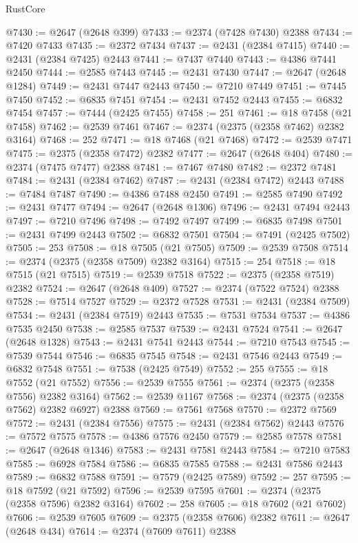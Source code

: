 \begin{lexlean}{RustCore}
\begin{coremodule}
@7430 := @2647 (@2648 @399)
@7433 := @2374 (@7428 @7430) @2388
@7434 := @7420 @7433
@7435 := @2372 @7434
@7437 := @2431 (@2384 @7415)
@7440 := @2431 (@2384 @7425) @2443
@7441 := @7437 @7440
@7443 := @4386 @7441 @2450
@7444 := @2585 @7443
@7445 := @2431 @7430
@7447 := @2647 (@2648 @1284)
@7449 := @2431 @7447 @2443
@7450 := @7210 @7449
@7451 := @7445 @7450
@7452 := @6835 @7451
@7454 := @2431 @7452 @2443
@7455 := @6832 @7454
@7457 := @7444 (@2425 @7455)
@7458 := 251
@7461 := @18 @7458 (@21 @7458)
@7462 := @2539 @7461
@7467 := @2374 (@2375 (@2358 @7462) @2382 @3164)
@7468 := 252
@7471 := @18 @7468 (@21 @7468)
@7472 := @2539 @7471
@7475 := @2375 (@2358 @7472) @2382
@7477 := @2647 (@2648 @404)
@7480 := @2374 (@7475 @7477) @2388
@7481 := @7467 @7480
@7482 := @2372 @7481
@7484 := @2431 (@2384 @7462)
@7487 := @2431 (@2384 @7472) @2443
@7488 := @7484 @7487
@7490 := @4386 @7488 @2450
@7491 := @2585 @7490
@7492 := @2431 @7477
@7494 := @2647 (@2648 @1306)
@7496 := @2431 @7494 @2443
@7497 := @7210 @7496
@7498 := @7492 @7497
@7499 := @6835 @7498
@7501 := @2431 @7499 @2443
@7502 := @6832 @7501
@7504 := @7491 (@2425 @7502)
@7505 := 253
@7508 := @18 @7505 (@21 @7505)
@7509 := @2539 @7508
@7514 := @2374 (@2375 (@2358 @7509) @2382 @3164)
@7515 := 254
@7518 := @18 @7515 (@21 @7515)
@7519 := @2539 @7518
@7522 := @2375 (@2358 @7519) @2382
@7524 := @2647 (@2648 @409)
@7527 := @2374 (@7522 @7524) @2388
@7528 := @7514 @7527
@7529 := @2372 @7528
@7531 := @2431 (@2384 @7509)
@7534 := @2431 (@2384 @7519) @2443
@7535 := @7531 @7534
@7537 := @4386 @7535 @2450
@7538 := @2585 @7537
@7539 := @2431 @7524
@7541 := @2647 (@2648 @1328)
@7543 := @2431 @7541 @2443
@7544 := @7210 @7543
@7545 := @7539 @7544
@7546 := @6835 @7545
@7548 := @2431 @7546 @2443
@7549 := @6832 @7548
@7551 := @7538 (@2425 @7549)
@7552 := 255
@7555 := @18 @7552 (@21 @7552)
@7556 := @2539 @7555
@7561 := @2374 (@2375 (@2358 @7556) @2382 @3164)
@7562 := @2539 @1167
@7568 := @2374 (@2375 (@2358 @7562) @2382 @6927) @2388
@7569 := @7561 @7568
@7570 := @2372 @7569
@7572 := @2431 (@2384 @7556)
@7575 := @2431 (@2384 @7562) @2443
@7576 := @7572 @7575
@7578 := @4386 @7576 @2450
@7579 := @2585 @7578
@7581 := @2647 (@2648 @1346)
@7583 := @2431 @7581 @2443
@7584 := @7210 @7583
@7585 := @6928 @7584
@7586 := @6835 @7585
@7588 := @2431 @7586 @2443
@7589 := @6832 @7588
@7591 := @7579 (@2425 @7589)
@7592 := 257
@7595 := @18 @7592 (@21 @7592)
@7596 := @2539 @7595
@7601 := @2374 (@2375 (@2358 @7596) @2382 @3164)
@7602 := 258
@7605 := @18 @7602 (@21 @7602)
@7606 := @2539 @7605
@7609 := @2375 (@2358 @7606) @2382
@7611 := @2647 (@2648 @434)
@7614 := @2374 (@7609 @7611) @2388

\end{coremodule}
\end{lexlean}
